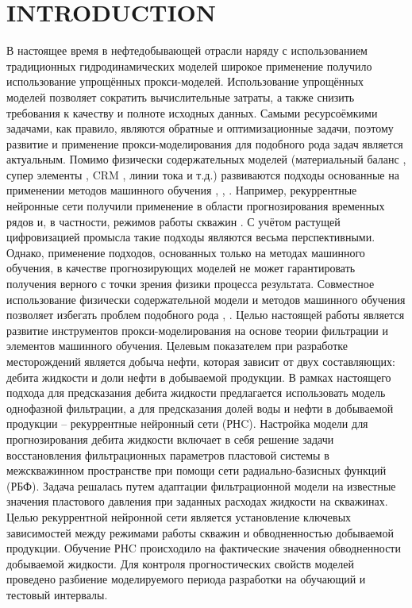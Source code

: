 \documentclass{article}
\begin{document}
\maketitle




\section{INTRODUCTION}

В настоящее время в нефтедобывающей отрасли наряду с использованием традиционных гидродинамических моделей широкое применение получило использование упрощённых прокси-моделей. Использование упрощённых моделей позволяет сократить вычислительные затраты, а также снизить требования к качеству и полноте исходных данных. Самыми ресурсоёмкими задачами, как правило, являются обратные и оптимизационные задачи, поэтому развитие и применение прокси-моделирования для подобного рода задач является актуальным. Помимо физически содержательных моделей (материальный баланс \cite{mus1}, супер элементы \cite{maz}, CRM \cite{bek}, линии тока \cite{pot} и т.д.) развиваются подходы основанные на применении методов машинного обучения \cite{tem}, \cite{ill}, \cite{uma}. Например, рекуррентные нейронные сети получили применение в области прогнозирования временных рядов и, в частности, режимов работы скважин \cite{gop}. С учётом растущей цифровизацией промысла такие подходы являются весьма перспективными. Однако, применение подходов, основанных только на методах машинного обучения, в качестве прогнозирующих моделей не может гарантировать получения верного с точки зрения физики процесса результата. Совместное использование физически содержательной модели и методов машинного обучения позволяет избегать проблем подобного рода \cite{kos1}, \cite{kos2}.
Целью настоящей работы является развитие инструментов прокси-моделирования на основе теории фильтрации и элементов машинного обучения. Целевым показателем при разработке месторождений является добыча нефти, которая зависит от двух составляющих: дебита жидкости и доли нефти в добываемой продукции. В рамках настоящего подхода для предсказания дебита жидкости предлагается использовать модель однофазной фильтрации, а для предсказания долей воды и нефти в добываемой продукции – рекуррентные нейронный сети (РНC). Настройка модели для прогнозирования дебита жидкости включает в себя решение задачи восстановления фильтрационных параметров пластовой системы в межскважинном пространстве при помощи сети радиально-базисных функций (РБФ). Задача решалась путем адаптации фильтрационной модели на известные значения пластового давления при заданных расходах жидкости на скважинах. Целью рекуррентной нейронной сети является установление ключевых зависимостей между режимами работы скважин и обводненностью добываемой продукции. Обучение РНC происходило на фактические значения обводненности добываемой жидкости. Для контроля прогностических свойств моделей проведено разбиение моделируемого периода разработки на обучающий и тестовый интервалы.
\end{document}
